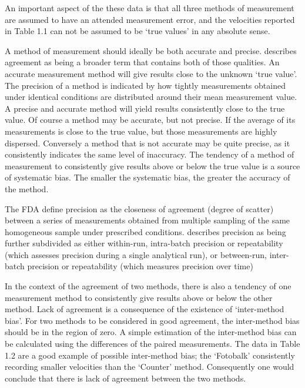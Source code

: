 \documentclass[12pt, a4paper]{report}
\begin{document}
An important aspect of the these data is that all three methods of
measurement are assumed to have an attended measurement error, and
the velocities reported in Table 1.1 can not be assumed to be
`true values' in any absolute sense.


A method of measurement should ideally be both accurate and
precise. \citet{Barnhart} describes agreement as being a broader
term that contains both of those qualities. An accurate
measurement method will give results close to the unknown `true
value'. The precision of a method is indicated by how tightly
measurements obtained under identical conditions are distributed
around their mean measurement value. A precise and accurate method
will yield results consistently close to the true value. Of course
a method may be accurate, but not precise. If the average of its
measurements is close to the true value, but those measurements
are highly dispersed. Conversely a method that is not accurate may
be quite precise, as it consistently indicates the same level of
inaccuracy. The tendency of a method of measurement to
consistently give results above or below the true value is a
source of systematic bias. The smaller the systematic bias, the
greater the accuracy of the method.


The FDA define precision as the closeness of agreement (degree of
scatter) between a series of measurements obtained from multiple
sampling of the same homogeneous sample under prescribed
conditions. \citet{Barnhart} describes precision as being further
subdivided as either within-run, intra-batch precision or
repeatability (which assesses precision during a single analytical
run), or between-run, inter-batch precision or repeatability
(which measures precision over time)

In the context of the agreement of two methods, there is also a
tendency of one measurement method to consistently give results
above or below the other method. Lack of agreement is a
consequence of the existence of `inter-method bias'. For two
methods to be considered in good agreement, the inter-method bias
should be in the region of zero. A simple estimation of the
inter-method bias can be calculated using the differences of the
paired measurements. The data in Table 1.2 are a good example of
possible inter-method bias; the `Fotobalk' consistently recording
smaller velocities than the `Counter' method. Consequently one
would conclude that there is lack of agreement between the two
methods.
\end{document}
